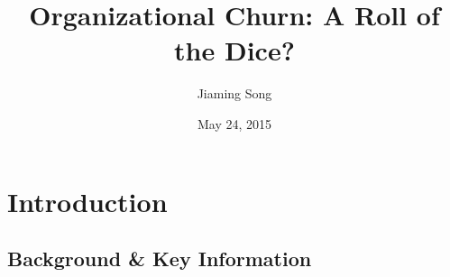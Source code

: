 \documentclass{beamer}
\title[Organizational Churn: A Roll of the Dice?]{Organizational Churn: A Roll of the Dice?} %
\author{Jiaming Song} %
\institute[Tsinghua University] %
{
Tsinghua University \\ %
\medskip
\textit{jiaming.tsong@gmail.com} %
}
\date{May 24, 2015} %
\begin{document}
\begin{frame}
\titlepage %
\end{frame}

\iffalse
\begin{frame}
\frametitle{Overview} %
\tableofcontents %
\end{frame}
\fi

\section{Introduction} %

\subsection{Background \& Key Information} %
\end{document}
